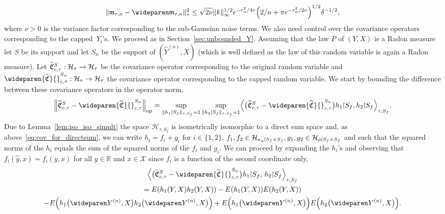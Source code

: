 \documentclass[AHL,Unicode,longabstracts,published]{cedram}
\theoremstyle{remark}
\DeclareMathOperator{\opp}{op}
\newcommand{\restrr}
{\!\!\upharpoonright\!\!}
\newcommand{\R}{\mathbb{R}}
\newcommand{\X}{\mathcal{X}}
\newcommand{\cH}{\mathcal{H}}
\newcommand{\fkC}{\mathfrak{C}}
\newcommand{\Cov}{\tilde{\fkC}}
\newcommand{\mean}{\mathfrak{m}}
\newcommand{\CovCapntau}{\wideparen{\widetilde{\fkC}}{\vphantom{\fkC}}^{S_n}_{c,\tau}}
\newcommand*{\mk}{\mkern -1mu}
\let\oldtilde\tilde
\renewcommand*{\tilde}[1]{\mathchoice{\widetilde{#1}}{\widetilde{#1}}{\oldtilde{#1}}{\oldtilde{#1}}}
\renewcommand*{\to}{\mathchoice{\longrightarrow}{\rightarrow}{\rightarrow}{\rightarrow}}
\let\originalleft\left
\let\originalright\right
\renewcommand{\left}{\mathopen{}\mathclose\bgroup\originalleft}
\renewcommand{\right}{\aftergroup\egroup\originalright}
\begin{document}
\begin{equation}
\| \mean_{\tau,n} - \wideparen \mean_{\tau,n} \|^2_\tau \leq \sqrt{2 \nu} \|k\|^{1/2}_\infty e^{-r_n^2/4 \nu} \Bigl(2/n + \pi e^{-r_n^2/2 \nu} \Bigr)^{1/2}
\delta^{-1/2}, \label{eq:direct_sum_mean}
\end{equation}
where $\nu>0$ is the variance factor corresponding to the sub-Gaussian noise terms. We also need control over the covariance operators corresponding to the capped~$Y_i$'s. We proceed as in Section~\ref{sec:unbounded_Y}. Assuming that the law $P$ of $(Y,X)$ is a Radon measure let $S$ be its support and let $S_n$ be the support of $(\wideparen Y^{(n)}, X)$ (which is well defined as the law of this random variable is again a Radon measure). Let $\Cov_{c,\tau}^S : \cH_\tau \to \cH_\tau$ be the covariance operator corresponding to the original random variable and $\CovCapntau: \cH_\tau \to \cH_\tau$ the covariance operator corresponding to the capped random variable. We start by bounding the difference between these covariance operators in the operator norm,
\begin{align*}
\left\|\Cov_{c,\tau}^S - \CovCapntau\right\|_{\opp} = \sup_{\|h_1 \mk\upharpoonright\mk S_f\|_{\tau,S_f} =1} \sup_{\|h_2 \mk\upharpoonright\mk S_f\|_{\tau,S_f} =1}
\left\langle \bigl(\Cov_{c,\tau}^S - \CovCapntau\bigr) h_1 \restrr S_f, h_2 \restrr S_f\right\rangle_{\tau,S_f}.
\end{align*}
Due to Lemma~\ref{lem:iso_iso_simult} the space $\cH_{\tau,S_f}$ is isometrically isomorphic to a direct sum space and, as above~\eqref{eq:cov_for_directsum}, we can write $h_i = f_i + g_i$ for $i \in \{1,2\}$, $f_1,f_2 \in \cH_{\kappa_y\mk\upharpoonright\mk S_f \times S_f}, g_1,g_2 \in \cH_{\rho \mk\upharpoonright\mk S_f \times S_f}$ and such that the squared norms of the $h_i$ equals the sum of the squared norms of the $f_i$ and $g_i$. We can proceed by expanding the $h_i$'s and observing that $f_i(\wideparen y,x) = f_i(y,x)$ for all $y \in \R$ and $x\in \X$ since $f_i$ is a function of the second coordinate only,
\begin{multline*}
\left\langle \bigl(\Cov_{c,\tau}^S - \CovCapntau\bigr) h_1 \restrr S_f,\, h_2 \restrr S_f\right\rangle_{\tau,S_f} \\
= E(h_1(Y,X) h_2(Y,X)) - E(h_1(Y,X)) E(h_2(Y,X)) \\  - E\left(h_1\bigl(\wideparen Y^{(n)},X\bigr) h_2\bigl(\wideparen Y^{(n)},X\bigr)\right) + E\left(h_1\bigl(\wideparen Y^{(n)},X\bigr)\right) E\left(h_2\bigl(\wideparen Y^{(n)},X\bigr)\right).
\end{multline*}
\end{document}
